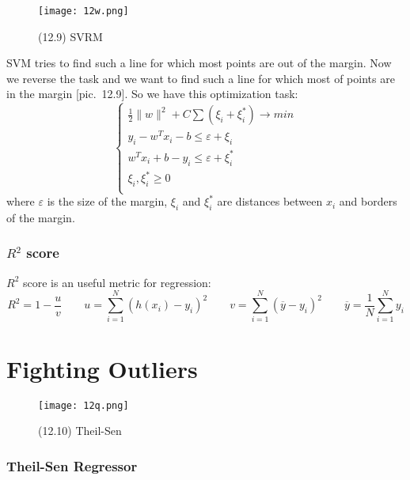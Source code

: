 \begin{wrapfigure}{r}{0.4\linewidth}
	\vspace{-1cm}
  \begin{center}
    \texttt{[image: 12w.png]}
  \end{center}
  \vspace{-0.6cm}
  \caption*{(12.9) SVRM}
  \vspace{-1cm}
\end{wrapfigure}
SVM tries to find such a line for which most points are out of the margin. Now we reverse the task and we want to find such a line for which most of points are in the margin [pic.~12.9]. So we have this optimization task:
$$\begin{cases}
	\frac{1}{2}\|w\|^2+C\sum(\xi_i+\xi_i^*)\to min \\
	y_i-w^Tx_i-b\le\varepsilon+\xi_i \\
	w^Tx_i+b-y_i\le\varepsilon+\xi_i^* \\
	\xi_i,\xi_i^* \ge 0 \\
\end{cases}$$
where $\varepsilon$ is the size of the margin, $\xi_i$ and $\xi_i^*$ are distances between $x_i$ and borders of the margin.

\subsubsection*{$R^2$ score}

$R^2$ score is an useful metric for regression:
$$R^2=1-\frac{u}{v}\qquad u=\sum\limits_{i=1}^{N}(h(x_i)-y_i)^2\qquad v=\sum\limits_{i=1}^{N}(\overline{y}-y_i)^2\qquad \overline{y}=\frac{1}{N}\sum\limits_{i=1}^{N}y_i$$

\section{Fighting Outliers}
\vspace{-0.6cm}

\begin{wrapfigure}{r}{0.26\linewidth}
	\vspace{-2.7cm}
  \begin{center}
    \texttt{[image: 12q.png]}
  \end{center}
  \vspace{-0.6cm}
  \caption*{(12.10) Theil-Sen}
\end{wrapfigure}

\subsubsection*{Theil-Sen Regressor}

